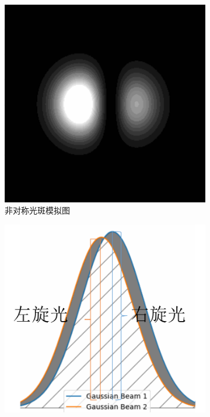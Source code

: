 \documentclass[12pt]{ctexart}
\numberwithin{equation}{section} %
\begin{document}
\begin{figure}[H] %
    \centering %
    \begin{subfigure}{0.3\textwidth} %
        \centering
        \includegraphics[width=\textwidth, trim=40pt 40pt 40pt 40pt, clip]{非对称光斑模拟图.png} %
        \caption{非对称光斑模拟图} %
        \label{fig:非对称光斑模拟图} %
    \end{subfigure}
    \hspace{0.05\textwidth} %
    \begin{subfigure}{0.3\textwidth} %
        \centering
        \includegraphics[width=\textwidth]{非对称光斑示意图.png} %

\end{subfigure}
\end{figure}
\end{document}
